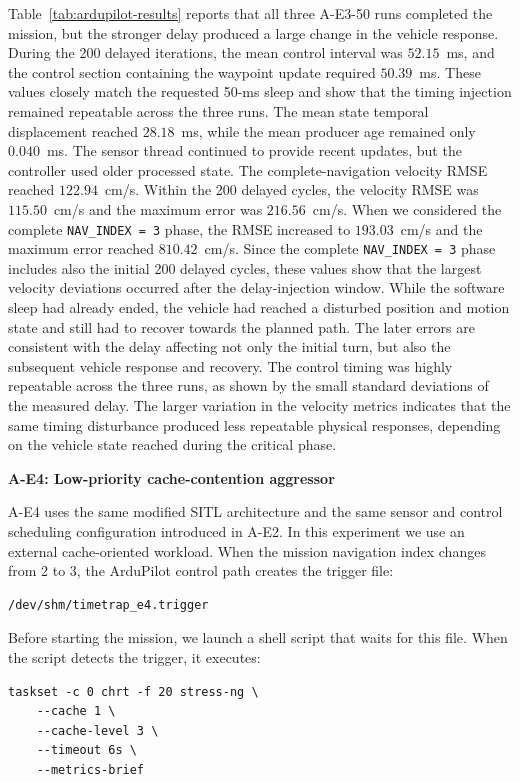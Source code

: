 \noindent Table~\ref{tab:ardupilot-results} reports that all three A-E3-50 runs completed the mission, but the stronger delay produced a large change in the vehicle response. 
During the 200 delayed iterations, the mean control interval was
\(52.15\)~ms, and the control section containing the waypoint update required \(50.39\)~ms. These values closely match the requested 50-ms sleep and show that the timing injection remained repeatable across the three runs.
The mean state temporal displacement reached \(28.18\)~ms, while the mean producer age remained only \(0.040\)~ms. The sensor thread continued to provide recent updates, but the controller used older processed state.
The complete-navigation velocity RMSE reached \(122.94\)~cm/s. 
Within the 200 delayed cycles, the velocity RMSE was
\(115.50\)~cm/s and the maximum error was \(216.56\)~cm/s.
When we considered the complete \texttt{NAV\_INDEX = 3} phase,
the RMSE increased to \(193.03\)~cm/s and the maximum error reached
\(810.42\)~cm/s.
Since the complete \texttt{NAV\_INDEX = 3} phase includes also the initial 200 delayed cycles, these values show that the largest velocity deviations occurred after the delay-injection window. While the software sleep had already ended, the vehicle had reached a disturbed position and motion state and still had to recover towards the planned path. The later errors are consistent with the delay affecting not only the initial turn, but also the subsequent vehicle response and recovery.
The control timing was highly repeatable across the three runs, as
shown by the small standard deviations of the measured delay.
The larger variation in the velocity metrics indicates that the same timing disturbance produced less repeatable physical responses, depending on the vehicle state reached during the critical phase.

\noindent \textbf{A-E4: Low-priority cache-contention aggressor}

\noindent A-E4 uses the same modified SITL architecture and the same sensor and control scheduling configuration introduced in A-E2. In this experiment we use an external cache-oriented workload. When the mission navigation index changes from 2 to 3, the ArduPilot control path creates the trigger file:
\begin{verbatim}
/dev/shm/timetrap_e4.trigger
\end{verbatim}
\noindent Before starting the mission, we launch a shell script that waits for this file. When the script detects the trigger, it executes:
\begin{verbatim}
taskset -c 0 chrt -f 20 stress-ng \
    --cache 1 \
    --cache-level 3 \
    --timeout 6s \
    --metrics-brief
\end{verbatim}

